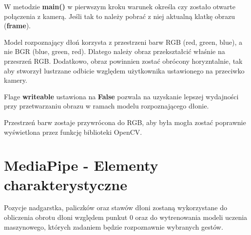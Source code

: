 \quad W metodzie \textbf{main()} w pierwszym kroku warunek określa czy zostało otwarte połączenia z kamerą. Jeśli tak to należy pobrać z niej aktualną klatkę obrazu (\textbf{frame}). \newline



\quad Model rozpoznający dłoń korzysta z przestrzeni barw RGB (red, green, blue), a nie BGR (blue, green, red). Dlatego należy obraz przekształcić właśnie na przesrzeń RGB. Dodatkowo, obraz powinnien zostać obrócony horyzntalnie, tak aby stworzył lustrzane odbicie względem użytkownika ustawionego na przeciwko kamery. \newline



\quad Flage \textbf{writeable} ustawiona na \textbf{False} pozwala na uzyskanie lepszej wydajności przy przetwarzaniu obrazu w ramach modelu rozpoznającego dłonie.\newline 



\quad Przestrzeń barw zostaje przywrócona do RGB, aby była mogła zostać poprawnie wyświetlona przez funkcję biblioteki OpenCV. \newline





\section{MediaPipe - Elementy charakterystyczne}

\quad Pozycje nadgarstka, paliczków oraz stawów dłoni zostaną wykorzystane do obliczenia obrotu dłoni względem punkut 0 oraz do wytrenowania modeli uczenia maszynowego, których zadaniem będzie rozpoznawnie wybranych gestów. 


